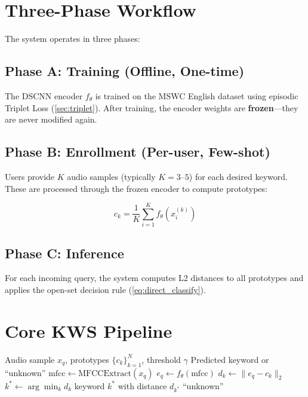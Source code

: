 \documentclass[12pt,a4paper]{report}
\begin{document}
\section{Three-Phase Workflow}

The system operates in three phases:

\subsection{Phase A: Training (Offline, One-time)}

The DSCNN encoder $f_\theta$ is trained on the MSWC English dataset using
episodic Triplet Loss (\cref{sec:triplet}). After training, the encoder
weights are \textbf{frozen}---they are never modified again.

\subsection{Phase B: Enrollment (Per-user, Few-shot)}

Users provide $K$ audio samples (typically $K = 3$--$5$) for each desired
keyword. These are processed through the frozen encoder to compute prototypes:

\begin{equation}
    c_k = \frac{1}{K} \sum_{i=1}^{K} f_\theta(x_i^{(k)})
\end{equation}

\subsection{Phase C: Inference}

For each incoming query, the system computes L2 distances to all prototypes
and applies the open-set decision rule (\cref{eq:direct_classify}).


\section{Core KWS Pipeline}

\begin{algorithm}[h]
\caption{Few-Shot Open-Set KWS Inference}
\label{alg:kws_inference}
\begin{algorithmic}[1]
\Require Audio sample $x_q$, prototypes $\{c_k\}_{k=1}^N$, threshold $\gamma$
\Ensure Predicted keyword or ``unknown''
\State $\text{mfcc} \gets \text{MFCCExtract}(x_q)$
\State $e_q \gets f_\theta(\text{mfcc})$
    \State $d_k \gets \|e_q - c_k\|_2$
\EndFor
\State $k^* \gets \arg\min_k d_k$
    \State \Return keyword $k^*$ with distance $d_{k^*}$
\Else
    \State \Return ``unknown''
\EndIf
\end{algorithmic}
\end{algorithm}
\end{document}
